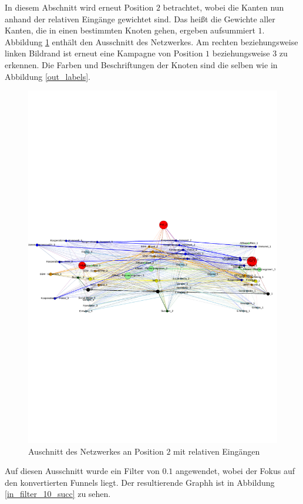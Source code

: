 In diesem Abschnitt wird erneut Position $2$ betrachtet, wobei die Kanten nun anhand der relativen Eingänge gewichtet sind. Das heißt die Gewichte aller Kanten, die in einen bestimmten Knoten gehen, ergeben aufsummiert $1$. Abbildung \ref{in_labels} enthält den Ausschnitt des Netzwerkes. Am rechten beziehungsweise linken Bildrand ist erneut eine Kampagne von Position $1$ beziehungsweise $3$ zu erkennen. Die Farben und Beschriftungen der Knoten sind die selben wie in Abbildung \ref{out_labels}. 
\begin{figure}[H]
	\centering\includegraphics[scale=0.9]{in_labels.pdf}\caption[Relative Eingänge]{Auschnitt des Netzwerkes an Position $2$ mit relativen Eingängen}\label{in_labels}
\end{figure}
\noindent Auf diesen Ausschnitt wurde ein Filter von $0.1$ angewendet, wobei der Fokus auf den konvertierten Funnels liegt. Der resultierende Graphh ist in Abbildung \ref{in_filter_10_succ} zu sehen.
